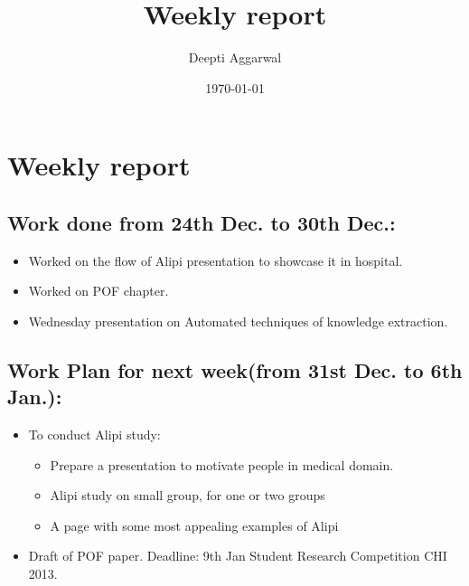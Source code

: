 \documentclass[11pt]{article}
\title{Weekly report}
\author{Deepti Aggarwal}
\date{\today}
\begin{document}
\maketitle

\setcounter{tocdepth}{3}
\vspace*{1cm}
\section{Weekly report}
\label{sec-1}


\subsection{Work done from 24th Dec. to 30th Dec.:}
\label{sec-1-1}
\begin{itemize}
\item Worked on the flow of Alipi presentation to showcase it in hospital.
\item Worked on POF chapter.
\item Wednesday presentation on Automated techniques of knowledge extraction. 
\end{itemize}


\subsection{Work Plan for next week(from 31st Dec. to 6th Jan.):}
\label{sec-1-2}
\begin{itemize}
\item To conduct Alipi study:
\begin{itemize}
\item Prepare a presentation to motivate people in medical domain.
\item Alipi study on small group, for one or two groups
\item A page with some most appealing examples of Alipi
\end{itemize}
\item Draft of POF paper. Deadline: 9th Jan Student Research Competition CHI 2013. 
\end{itemize}
\end{document}
